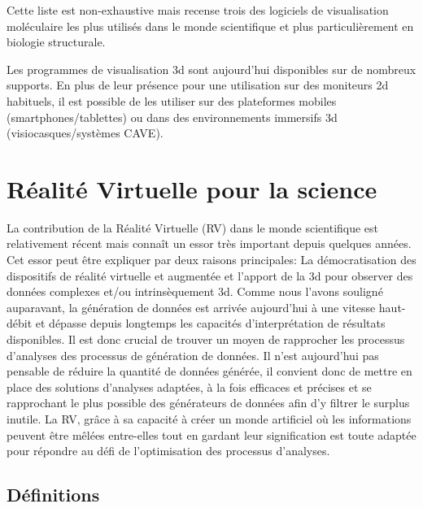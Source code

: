Cette liste est non-exhaustive mais recense trois des logiciels de visualisation moléculaire les plus utilisés dans le monde scientifique et plus particulièrement en biologie structurale.

Les programmes de visualisation 3d sont aujourd'hui disponibles sur de nombreux supports. En plus de leur présence pour une utilisation sur des moniteurs 2d habituels, il est possible de les utiliser sur des plateformes mobiles (smartphones/tablettes) ou dans des environnements immersifs 3d (visiocasques/systèmes CAVE).

\section{Réalité Virtuelle pour la science}

La contribution de la Réalité Virtuelle (RV) dans le monde scientifique est relativement récent mais connaît un essor très important depuis quelques années. Cet essor peut être expliquer par deux raisons principales: La démocratisation des dispositifs de réalité virtuelle et augmentée et l'apport de la 3d pour observer des données complexes et/ou intrinsèquement 3d. Comme nous l'avons souligné auparavant, la génération de données est arrivée aujourd'hui à une vitesse haut-débit et dépasse depuis longtemps les capacités d'interprétation de résultats disponibles. Il est donc crucial de trouver un moyen de rapprocher les processus d'analyses des processus de génération de données. Il n'est aujourd'hui pas pensable de réduire la quantité de données générée, il convient donc de mettre en place des solutions d'analyses adaptées, à la fois efficaces et précises et se rapprochant le plus possible des générateurs de données afin d'y filtrer le surplus inutile. La RV, grâce à sa capacité à créer un monde artificiel où les informations peuvent être mêlées entre-elles tout en gardant leur signification est toute adaptée pour répondre au défi de l'optimisation des processus d'analyses.

\subsection{Définitions}

